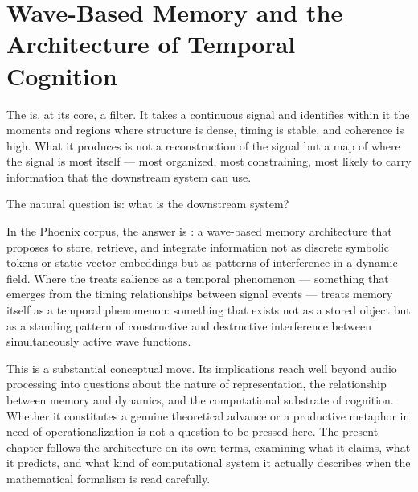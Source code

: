 
\chapter{Wave-Based Memory and the Architecture of Temporal Cognition}
\label{ch:mem8}


\noindent
The \Marine{} is, at its core, a filter. It takes a continuous
signal and identifies within it the moments and regions where
structure is dense, timing is stable, and coherence is high. What
it produces is not a reconstruction of the signal but a map of
where the signal is most itself --- most organized, most
constraining, most likely to carry information that the downstream
system can use.

The natural question is: what is the downstream system?

In the Phoenix corpus, the answer is \MEMeight{}: a wave-based
memory architecture that proposes to store, retrieve, and integrate
information not as discrete symbolic tokens or static vector
embeddings but as patterns of interference in a dynamic field.
Where the \Marine{} treats salience as a temporal phenomenon ---
something that emerges from the timing relationships between signal
events --- \MEMeight{} treats memory itself as a temporal phenomenon:
something that exists not as a stored object but as a standing
pattern of constructive and destructive interference between
simultaneously active wave functions.

This is a substantial conceptual move. Its implications reach well
beyond audio processing into questions about the nature of
representation, the relationship between memory and dynamics, and
the computational substrate of cognition. Whether it constitutes a
genuine theoretical advance or a productive metaphor in need of
operationalization is not a question to be pressed here. The
present chapter follows the architecture on its own terms, examining
what it claims, what it predicts, and what kind of computational
system it actually describes when the mathematical formalism is
read carefully.

